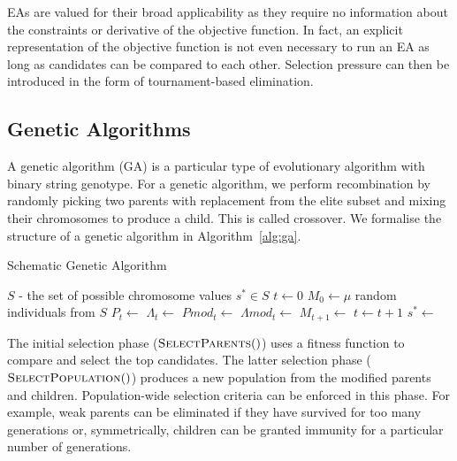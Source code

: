 EAs are valued for their broad applicability as they require no information about the constraints or derivative of the objective function. In fact, an explicit representation of the objective function is not even necessary to run an EA as long as candidates can be compared to each other. Selection pressure can then be introduced in the form of tournament-based elimination.

\subsection{Genetic Algorithms}

A genetic algorithm (GA) is a particular type of evolutionary algorithm with binary string genotype. For a genetic algorithm, we perform recombination by randomly picking two parents with replacement from the elite subset and mixing their chromosomes to produce a child. This is called crossover. We formalise the structure of a genetic algorithm in Algorithm~\ref{alg:ga}.\\

\begin{algorithm}
  \caption{Schematic Genetic Algorithm}\label{alg:ga}
  \begin{algorithmic}
  \Require $S$ - the set of possible chromosome values
  \Ensure $s^* \in S$
  \State $t \gets 0$
  \State $M_0 \gets \mu$ random individuals from $S$
    \State {}
    \State $P_t \gets$     
    \State $\Lambda_t \gets$   
    \State $Pmod_t \gets$ 
    \State $\Lambda mod_t \gets$ 
    \State $M_{t+1} \gets$ 
    \State $t \gets t+1$
  \EndWhile
  \State $s^* \gets$ 
  \end{algorithmic}
\end{algorithm}

The initial selection phase ($\Call{SelectParents}$) uses a fitness function to compare and select the top candidates. The latter selection phase ($\Call{SelectPopulation}$) produces a new population from the modified parents and children. Population-wide selection criteria can be enforced in this phase. For example, weak parents can be eliminated if they have survived for too many generations or, symmetrically, children can be granted immunity for a particular number of generations.\\

